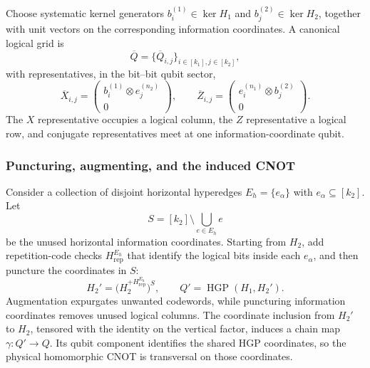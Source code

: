 \documentclass[11pt]{article}
\begin{document}
Choose systematic kernel generators $b_i^{(1)}\in\ker H_1$ and
$b_j^{(2)}\in\ker H_2$, together with unit vectors on the corresponding
information coordinates. A canonical logical grid is
\begin{equation}
  \overline Q=\{\overline Q_{i,j}\}_{i\in[k_1],j\in[k_2]},
  \label{eq:hgp-grid}
\end{equation}
with representatives, in the bit--bit qubit sector,
\begin{equation}
  \overline X_{i,j}=
  \begin{pmatrix}b_i^{(1)}\otimes e_j^{(n_2)}\\0\end{pmatrix},
  \qquad
  \overline Z_{i,j}=
  \begin{pmatrix}e_i^{(n_1)}\otimes b_j^{(2)}\\0\end{pmatrix}.
  \label{eq:hgp-logicals}
\end{equation}
The $X$ representative occupies a logical column, the $Z$ representative a
logical row, and conjugate representatives meet at one information-coordinate
qubit.

\subsubsection{Puncturing, augmenting, and the induced CNOT}

Consider a collection of disjoint horizontal hyperedges
$E_h=\{e_\alpha\}$ with $e_\alpha\subseteq[k_2]$. Let
\begin{equation}
  S=[k_2]\setminus\bigcup_{e\in E_h}e
  \label{eq:puncture-set}
\end{equation}
be the unused horizontal information coordinates. Starting from $H_2$, add
repetition-code checks $H_{\mathrm{rep}}^{E_h}$ that identify the logical bits
inside each $e_\alpha$, and then puncture the coordinates in $S$:
\begin{equation}
  H_2'=\bigl(H_2^{+H_{\mathrm{rep}}^{E_h}}\bigr)^S,
  \qquad
  Q'=\operatorname{HGP}(H_1,H_2').
  \label{eq:hgp-ancilla}
\end{equation}
Augmentation expurgates unwanted codewords, while puncturing information
coordinates removes unused logical columns. The coordinate inclusion from
$H_2'$ to $H_2$, tensored with the identity on the vertical factor, induces a
chain map $\gamma:Q'\to Q$. Its qubit component identifies the shared HGP
coordinates, so the physical homomorphic CNOT is transversal on those
coordinates.
\end{document}
